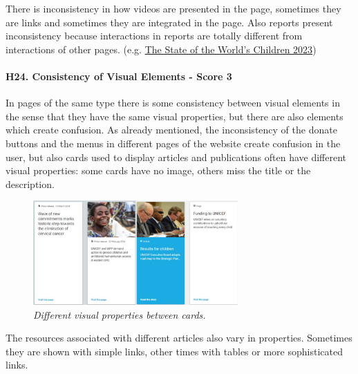 \newline There is inconsistency in how videos are presented in the page, sometimes they are links and sometimes they are integrated in the page.
\newline Also reports present inconsistency because interactions in reports are totally different from interactions of other pages. (e.g. \href{https://www.unicef.org/reports/state-worlds-children-2023}{The State of the World’s Children 2023})
\newline
\newline \paragraph{H24. Consistency of Visual Elements - Score 3}  \label{subsec:H24}	In pages of the same type there is some consistency between visual elements in the sense that they have the same visual properties, but there are also elements which create confusion.
\newline As already mentioned, the inconsistency of the donate buttons and the menus in different pages of the website create confusion in the user, but also cards used to display articles and publications often have different visual properties: some cards have no image, others miss the title or the description.
\begin{figure}[!h]
	\begin{center}
		\includegraphics[width=0.7\textwidth]{FinalScores28.jpg}
		\captionsetup{font=small}
		\caption{\textit{Different visual properties between cards.}}
	\end{center}
\end{figure}
\newline The resources associated with different articles also vary in properties. Sometimes they are shown with simple links, other times with tables or more sophisticated links.
